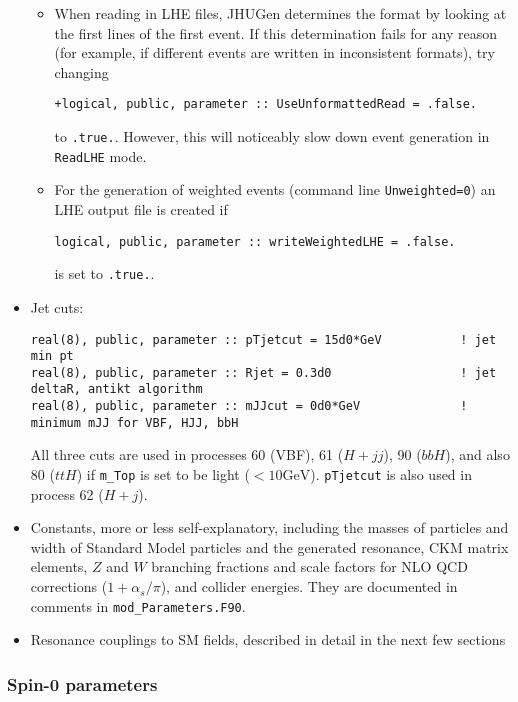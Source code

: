 \documentclass[aps,superscriptaddress,nofootinbib]{revtex4}
\begin{document}
\begin{itemize}
\begin{itemize}
\item
When reading in LHE files, JHUGen determines the format by looking at the first lines of the first event.  If this determination fails for any reason (for example, if different events are written in inconsistent formats), try changing
\begin{verbatim}
+logical, public, parameter :: UseUnformattedRead = .false.
\end{verbatim}
to \verb|.true.|.  However, this will noticeably slow down event generation in \verb|ReadLHE| mode.



\item
For the generation of weighted events (command line \verb|Unweighted=0|) an LHE output file is created if
\begin{verbatim}
logical, public, parameter :: writeWeightedLHE = .false.
\end{verbatim}
is set to \verb|.true.|.
\end{itemize}

\item
Jet cuts:
\begin{verbatim}
real(8), public, parameter :: pTjetcut = 15d0*GeV           ! jet min pt
real(8), public, parameter :: Rjet = 0.3d0                  ! jet deltaR, antikt algorithm
real(8), public, parameter :: mJJcut = 0d0*GeV              ! minimum mJJ for VBF, HJJ, bbH
\end{verbatim}
All three cuts are used in processes 60 (VBF), 61 ($H+jj$), 90 ($bbH$), and also 80 ($ttH$) if \verb|m_Top| is set to be light ($<10 \text{GeV}$).  \verb|pTjetcut| is also used in process 62 ($H+j$).

\item Constants, more or less self-explanatory, including the masses of particles and width of Standard Model particles and the generated resonance, CKM matrix elements, $Z$ and $W$ branching fractions and scale factors for NLO QCD corrections ($1+\alpha_s/\pi$), and collider energies.  They are documented in comments in \verb|mod_Parameters.F90|.

\item Resonance couplings to SM fields, described in detail in the next few sections
\end{itemize}

\subsubsection{ Spin-0 parameters }
\end{document}
